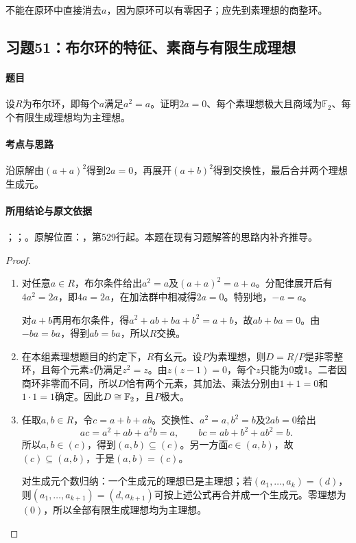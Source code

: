 不能在原环中直接消去$a$，因为原环可以有零因子；应先到素理想的商整环。



\subsection{习题51：布尔环的特征、素商与有限生成理想}

\label{ex:3:51}

\paragraph{题目}

设$R$为布尔环，即每个$a$满足$a^2=a$。证明$2a=0$、每个素理想极大且商域为$\mathbb F_2$、每个有限生成理想均为主理想。

\paragraph{考点与思路}

沿原解由$(a+a)^2$得到$2a=0$，再展开$(a+b)^2$得到交换性，最后合并两个理想生成元。

\paragraph{所用结论与原文依据}

；；。原解位置：，第529行起。本题在现有习题解答的思路内补齐推导。


\begin{proof}

\begin{enumerate}
\item 对任意$a\in R$，布尔条件给出$a^2=a$及$(a+a)^2=a+a$。分配律展开后有$4a^2=2a$，即$4a=2a$，在加法群中相减得$2a=0$。特别地，$-a=a$。

对$a+b$再用布尔条件，得$a^2+ab+ba+b^2=a+b$，故$ab+ba=0$。由$-ba=ba$，得到$ab=ba$，所以$R$交换。
\item 在本组素理想题目的约定下，$R$有幺元。设$P$为素理想，则$D=R/P$是非零整环，且每个元素$z$仍满足$z^2=z$。由$z(z-1)=0$，每个$z$只能为$0$或$1$。二者因商环非零而不同，所以$D$恰有两个元素，其加法、乘法分别由$1+1=0$和$1\cdot1=1$确定。因此$D\cong\mathbb F_2$，且$P$极大。
\item 任取$a,b\in R$，令$c=a+b+ab$。交换性、$a^2=a,b^2=b$及$2ab=0$给出
\[
ac=a^2+ab+a^2b=a,\qquad bc=ab+b^2+ab^2=b.
\]
所以$a,b\in(c)$，得到$(a,b)\subseteq(c)$。另一方面$c\in(a,b)$，故$(c)\subseteq(a,b)$，于是$(a,b)=(c)$。

对生成元个数归纳：一个生成元的理想已是主理想；若$(a_1,\ldots,a_k)=(d)$，则$(a_1,\ldots,a_{k+1})=(d,a_{k+1})$可按上述公式再合并成一个生成元。零理想为$(0)$，所以全部有限生成理想均为主理想。
\end{enumerate}

\end{proof}

